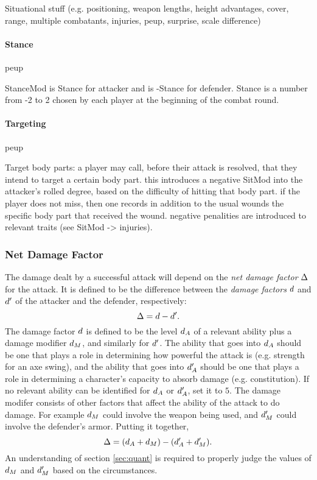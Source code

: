 \documentclass[12pt]{article}
\newcommand{\notes}[1]{{\color{Tan} #1}}
\begin{document}
\notes{Situational stuff (e.g. positioning, weapon lengths, height advantages, cover, range, multiple combatants, injuries, peup, surprise, scale difference)}

\paragraph{Stance}
peup

\notes{
				StanceMod is Stance for attacker and is -Stance for defender.
					Stance is a number from -2 to 2 chosen by each player at the beginning of the combat round.
}

\paragraph{Targeting}
peup

\notes{
Target body parts:
a player may call, before their attack is resolved, that they intend to target a certain body part.
this introduces a negative SitMod into the attacker's rolled degree, based on the difficulty of hitting that body part.
if the player does not miss, then one records in addition to the usual wounds the specific body part that received the wound.
negative penalities are introduced to relevant traits (see SitMod -> injuries).
}


\subsubsection{Net Damage Factor}\label{sec:ndf}
The damage dealt by a successful attack will depend on the \emph{net damage factor} $\Delta$
for the attack. It is defined to be the difference between the \emph{damage factors} $d$ 
and $d'$ of the attacker and the defender, respectively:
$$ \Delta = d - d'. $$
The damage factor $d$ is defined to be the level $d_A$ of a relevant ability
plus a damage modifier $d_M$, and similarly for $d'$.
The ability that goes into $d_A$ should be one that plays a role in determining how
powerful the attack is (e.g. strength for an axe swing), and the ability that goes into $d_A'$
should be one that plays a role in determining a character's capacity to absorb damage (e.g. constitution). 
If no relevant ability can be identified for $d_A$ or $d_A'$, set it to $5$. 
The damage modifer consists of other factors that affect the ability of the attack to do damage.
For example $d_M$ could involve the weapon being used, and $d_M'$ could involve the defender's armor.
Putting it together,
$$ \Delta = (d_A + d_M) - (d_A' + d_M'). $$
An understanding of section \ref{sec:quant} is required to properly judge the values of $d_M$ and $d_M'$
based on the circumstances.
\end{document}
